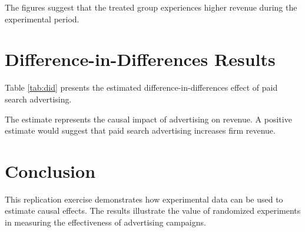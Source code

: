 \documentclass[12pt]{article}
\begin{document}
The figures suggest that the treated group experiences higher revenue during the experimental period.

\section{Difference-in-Differences Results}

Table \ref{tab:did} presents the estimated difference-in-differences effect of paid search advertising.



The estimate represents the causal impact of advertising on revenue. 
A positive estimate would suggest that paid search advertising increases firm revenue.

\section{Conclusion}

This replication exercise demonstrates how experimental data can be used to estimate causal effects. 
The results illustrate the value of randomized experiments in measuring the effectiveness of advertising campaigns.
\end{document}
